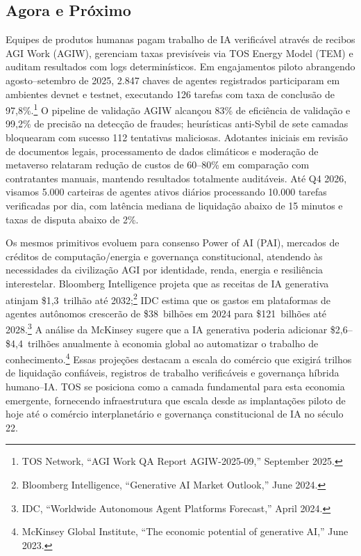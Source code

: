 \documentclass[11pt]{article}
\begin{document}
\subsection{Agora e Próximo}
\begin{description}[leftmargin=2.1cm, style=nextline]
  \item[12--24 Meses] Equipes de produtos humanas pagam trabalho de IA verificável através de recibos AGI Work (AGIW), gerenciam taxas previsíveis via TOS Energy Model (TEM) e auditam resultados com logs determinísticos. Em engajamentos piloto abrangendo agosto--setembro de 2025, 2.847 chaves de agentes registrados participaram em ambientes devnet e testnet, executando 126 tarefas com taxa de conclusão de 97,8\%.\footnote{TOS Network, ``AGI Work QA Report AGIW-2025-09,'' September 2025.} O pipeline de validação AGIW alcançou 83\% de eficiência de validação e 99,2\% de precisão na detecção de fraudes; heurísticas anti-Sybil de sete camadas bloquearam com sucesso 112 tentativas maliciosas. Adotantes iniciais em revisão de documentos legais, processamento de dados climáticos e moderação de metaverso relataram redução de custos de 60--80\% em comparação com contratantes manuais, mantendo resultados totalmente auditáveis. Até Q4 2026, visamos 5.000 carteiras de agentes ativos diários processando 10.000 tarefas verificadas por dia, com latência mediana de liquidação abaixo de 15 minutos e taxas de disputa abaixo de 2\%.

  \item[Arco de 100 Anos] Os mesmos primitivos evoluem para consenso Power of AI (PAI), mercados de créditos de computação/energia e governança constitucional, atendendo às necessidades da civilização AGI por identidade, renda, energia e resiliência interestelar. Bloomberg Intelligence projeta que as receitas de IA generativa atinjam \$1,3~trilhão até 2032;\footnote{Bloomberg Intelligence, ``Generative AI Market Outlook,'' June 2024.} IDC estima que os gastos em plataformas de agentes autônomos crescerão de \$38~bilhões em 2024 para \$121~bilhões até 2028.\footnote{IDC, ``Worldwide Autonomous Agent Platforms Forecast,'' April 2024.} A análise da McKinsey sugere que a IA generativa poderia adicionar \$2,6--\$4,4~trilhões anualmente à economia global ao automatizar o trabalho de conhecimento.\footnote{McKinsey Global Institute, ``The economic potential of generative AI,'' June 2023.} Essas projeções destacam a escala do comércio que exigirá trilhos de liquidação confiáveis, registros de trabalho verificáveis e governança híbrida humano--IA. TOS se posiciona como a camada fundamental para esta economia emergente, fornecendo infraestrutura que escala desde as implantações piloto de hoje até o comércio interplanetário e governança constitucional de IA no século 22.
\end{description}
\end{document}
